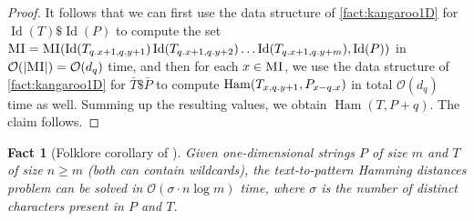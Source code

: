 \documentclass[11pt, letterpaper]{article}
\theoremstyle{plain}
\newtheorem{fact}{Fact}
\theoremstyle{definition}
\theoremstyle{remark}
\renewcommand{\O}{\mathcal{O}}
\DeclareMathOperator*{\Ham}{Ham}
\DeclareMathOperator*{\ID}{Id}
\begin{document}
\begin{proof}
It follows that we can first use the data structure of \cref{fact:kangaroo1D} for  $\ID(T) \$ \ID(P)$ to compute the set $\MI =  \MI(\ID(T_{\x{q}+1, \y{q}+1}) \ID(T_{\x{q}+1, \y{q}+2}) \ldots \ID(T_{\x{q}+1, \y{q}+m}), \ID(P))$ in $\O(|\MI|) = \O(d_q)$ time, and then for each $x \in \textsc{MI}$, we use the data structure of  \cref{fact:kangaroo1D}  for $\bar{T} \$ \bar{P}$ to compute 
$\Ham(T_{x, \y{q}+1}, P_{x-\x{q}})$ in total $\O(d_q)$ time as well. Summing up the resulting values, we obtain $\Ham(T, P+q)$. The claim follows. 
\end{proof}

\begin{fact}[Folklore corollary of \cite{CLIFFORD200753}]\label{fact:sigman1d}
Given one-dimensional strings $P$ of size $m$ and $T$ of size $n \ge m$ (both can contain wildcards), the text-to-pattern Hamming distances problem can be solved in $\O(\sigma \cdot n \log m)$ time, where $\sigma$ is the number of distinct characters present in $P$ and $T$.
\end{fact}
\end{document}
